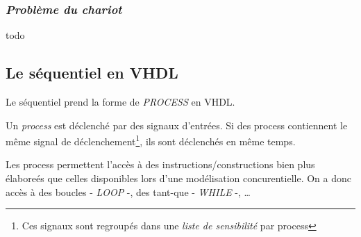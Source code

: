 \documentclass[11.5pt]{report}
\begin{document}
\subsubsection{\emph{Problème du chariot}}
todo

\subsection{Le séquentiel en VHDL}
Le séquentiel prend la forme de \emph{PROCESS} en VHDL.
\par
Un \emph{process} est déclenché par des signaux d'entrées.
Si des process contiennent le même signal de déclenchement\footnote{Ces signaux sont regroupés dans une \emph{liste de sensibilité} par process}, ils sont déclenchés en même temps.
\par
Les process permettent l'accès à des instructions/constructions bien plus élaboreés que celles disponibles lors d'une modélisation concurentielle.
On a donc accès à des boucles - \emph{LOOP} -, des tant-que - \emph{WHILE} -, \ldots
\end{document}
